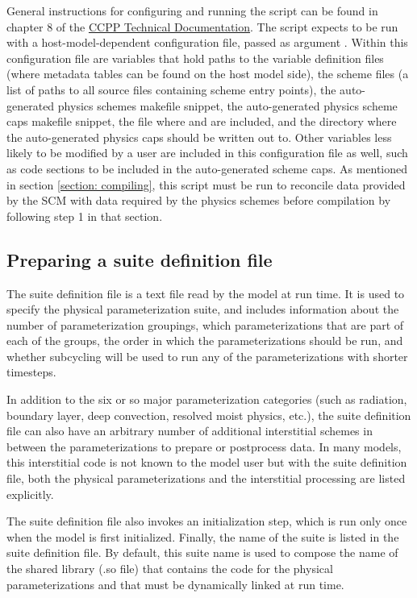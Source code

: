 General instructions for configuring and running the  script can be found in chapter 8 of the \href{https://dtcenter.org/GMTB/v3.0/ccpp\_tech\_guide}{CCPP Technical Documentation}. The script expects to be run with a host-model-dependent configuration file, passed as argument . Within this configuration file are variables that hold paths to the variable definition files (where metadata tables can be found on the host model side), the scheme files (a list of paths to all source files containing scheme entry points), the auto-generated physics schemes makefile snippet, the auto-generated physics scheme caps makefile snippet, the file where  and  are included, and the directory where the auto-generated physics caps should be written out to. Other variables less likely to be modified by a user are included in this configuration file as well, such as code sections to be included in the auto-generated scheme caps. As mentioned in section \ref{section: compiling}, this script must be run to reconcile data provided by the SCM with data required by the physics schemes before compilation by following step 1 in that section.

\subsection{Preparing a suite definition file}
The suite definition file is a text file read by the model at run time. It is used to specify the physical parameterization suite, and includes information about the number of parameterization groupings, which parameterizations that are part of each of the groups, the order in which the parameterizations should be run, and whether subcycling will be used to run any of the parameterizations with shorter timesteps.

In addition to the six or so major parameterization categories (such as radiation, boundary layer, deep convection, resolved moist physics, etc.), the suite definition file can also have an arbitrary number of additional interstitial schemes in between the parameterizations to prepare or postprocess data. In many models, this interstitial code is not known to the model user but with the suite definition file, both the physical parameterizations and the interstitial processing are listed explicitly.

The suite definition file also invokes an initialization step, which is run only once when the model is first initialized. Finally, the name of the suite is listed in the suite definition file. By default, this suite name is used to compose the name of the shared library (.so file) that contains the code for the physical parameterizations and that must be dynamically linked at run time.

